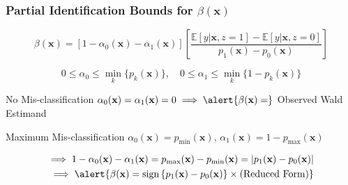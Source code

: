\documentclass{beamer}
\begin{document}
\begin{frame}
  \frametitle{Partial Identification Bounds for $\beta(\mathbf{x})$}

    \footnotesize
    \[
      \boxed{ \beta(\mathbf{x}) = \left[ 1 - \alpha_0(\mathbf{x}) - \alpha_1(\mathbf{x}) \right] 
     \left[\frac{\mathbb{E}\left[y|\mathbf{x},z=1\right] - \mathbb{E}\left[y|\mathbf{x},z=0\right]}{p_1(\mathbf{x}) - p_0(\mathbf{x})}\right] }
    \]

    \footnotesize
    \[
      \boxed{ 0 \leq \alpha_0 \leq \min_k \{p_k(\mathbf{x})\}, \quad 0 \leq \alpha_1 \leq \min_k \{1 - p_k(\mathbf{x})\}}
    \]

    \normalsize
    \begin{block}{No Mis-classification}
      $\alpha_0(\mathbf{x}) =  \alpha_1(\mathbf{x}) = 0 \implies \alert{\beta(\mathbf{x}) = }$ \alert{Observed Wald Estimand}
    \end{block}

    \begin{block}{Maximum Mis-classification}
      $\alpha_0(\mathbf{x}) = p_{\min}(\mathbf{x}), \, \alpha_1(\mathbf{x}) = 1 - p_{\max}(\mathbf{x})$

      \vspace{-0.5em}
      \begin{align*}
        \implies 1 - \alpha_0(\mathbf{x}) - \alpha_1(\mathbf{x}) = p_{\max}(\mathbf{x}) - p_{\min}(\mathbf{x})
      = |p_1(\mathbf{x}) - p_0(\mathbf{x})|\\
      \implies \alert{\beta(\mathbf{x}) =\mbox{sign}\left\{ p_1(\mathbf{x}) - p_0(\mathbf{x}) \right\}\times (\mbox{Reduced Form})}
    \end{align*}
      
    \end{block}
  
\end{frame}
\end{document}

